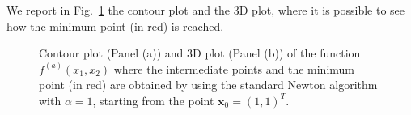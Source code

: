 \documentclass[a4paper,11pt]{article}
\begin{document}
	\noindent We report in Fig.~\ref{Fig:func_a} the contour plot and the 3D plot, where it is possible to see how the minimum point (in red) is reached.
	\begin{figure}[H]
		\centering
		 \quad
		\caption{Contour plot (Panel (a)) and 3D plot (Panel (b)) of the function $f^{(a)}(x_{1},x_{2})$ where the intermediate points and the minimum point (in red) are obtained by using the standard Newton algorithm with $\alpha=1$, starting from the point $\textbf{x}_{0}=(1,1)^{T}$.}
		\label{Fig:func_a}
	\end{figure}
\end{document}
